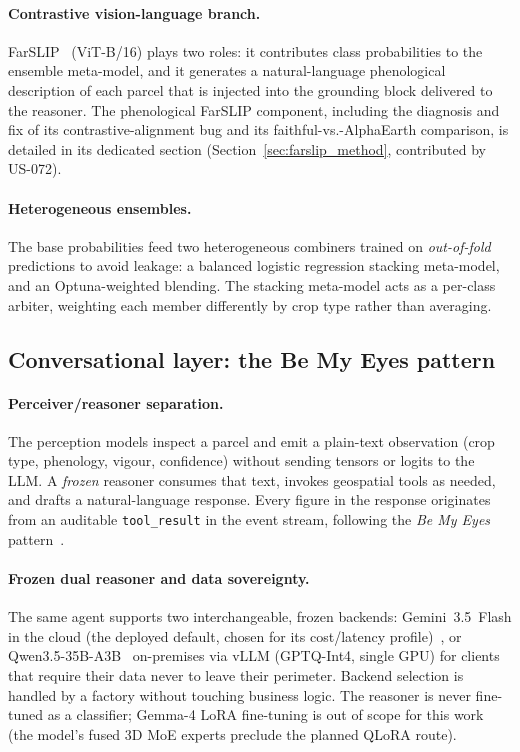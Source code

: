 \paragraph{Contrastive vision-language branch.}
FarSLIP~\cite{li2025farslip} (ViT-B/16) plays two roles: it contributes
class probabilities to the ensemble meta-model, and it generates a
natural-language phenological description of each parcel that is
injected into the grounding block delivered to the reasoner. The
phenological FarSLIP component, including the diagnosis and fix of its
contrastive-alignment bug and its faithful-vs.-AlphaEarth comparison,
is detailed in its dedicated section (Section~\ref{sec:farslip_method},
contributed by US-072).

\paragraph{Heterogeneous ensembles.}
The base probabilities feed two heterogeneous combiners trained on
\emph{out-of-fold} predictions to avoid leakage: a balanced logistic
regression stacking meta-model, and an Optuna-weighted blending. The
stacking meta-model acts as a per-class arbiter, weighting each member
differently by crop type rather than averaging.

\subsection{Conversational layer: the Be My Eyes pattern}
\label{sec:method-bemyeyes}

\paragraph{Perceiver/reasoner separation.}
The perception models inspect a parcel and emit a plain-text observation
(crop type, phenology, vigour, confidence) without sending tensors or
logits to the LLM. A \emph{frozen} reasoner consumes that text, invokes
geospatial tools as needed, and drafts a natural-language response.
Every figure in the response originates from an auditable
\texttt{tool\_result} in the event stream, following the \emph{Be My
Eyes} pattern~\cite{huang2025bemyeyes}.

\paragraph{Frozen dual reasoner and data sovereignty.}
The same agent supports two interchangeable, frozen backends:
Gemini~3.5~Flash in the cloud (the deployed default, chosen for its
cost/latency profile)~\cite{google2025gemini25}, or
Qwen3.5-35B-A3B~\cite{yang2025qwen3} on-premises via vLLM
(GPTQ-Int4, single GPU) for clients that require their data never to
leave their perimeter. Backend selection is handled by a factory
without touching business logic. The reasoner is never fine-tuned as a
classifier; Gemma-4 LoRA fine-tuning is out of scope for this work
(the model's fused 3D MoE experts preclude the planned QLoRA route).

